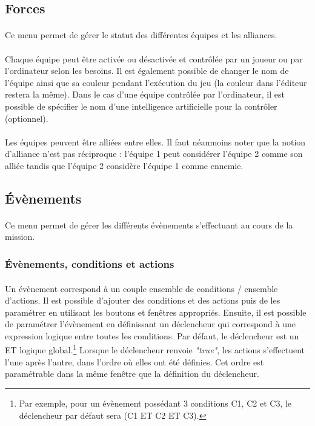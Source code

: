 \documentclass[a4paper]{article}
\begin{document}
\subsection{Forces}
\paragraph{ }
Ce menu permet de gérer le statut des différentes équipes et les alliances.
\paragraph{ }
Chaque équipe peut être activée ou désactivée et contrôlée par un joueur ou par l'ordinateur selon les besoins. Il est également possible de changer le nom de l'équipe ainsi que sa couleur pendant l'exécution du jeu (la couleur dans l'éditeur restera la même). Dans le cas d'une équipe contrôlée par l'ordinateur, il est possible de spécifier le nom d'une intelligence artificielle pour la contrôler (optionnel).
\paragraph{ }
Les équipes peuvent être alliées entre elles. Il faut néanmoins noter que la notion d'alliance n'est pas réciproque : l'équipe 1 peut considérer l'équipe 2 comme son alliée tandis que l'équipe 2 considère l'équipe 1 comme ennemie.
\subsection{Évènements}
\paragraph{ }
Ce menu permet de gérer les différents évènements s'effectuant au cours de la mission.
\subsubsection{Évènements, conditions et actions}
\paragraph{ }
Un évènement correspond à un couple ensemble de conditions / ensemble d'actions. Il est possible d'ajouter des conditions et des actions puis de les paramétrer en utilisant les boutons et fenêtres appropriés. Ensuite, il est possible de paramétrer l'évènement en définissant un déclencheur qui correspond à une expression logique entre toutes les conditions. Par défaut, le déclencheur est un ET logique global.\footnote{Par exemple, pour un évènement possédant 3 conditions C1, C2 et C3, le déclencheur par défaut sera (C1 ET C2 ET C3).} Lorsque le déclencheur renvoie \textit{"true"}, les actions s'effectuent l'une après l'autre, dans l'ordre où elles ont été définies. Cet ordre est paramétrable dans la même fenêtre que la définition du déclencheur.
\end{document}
